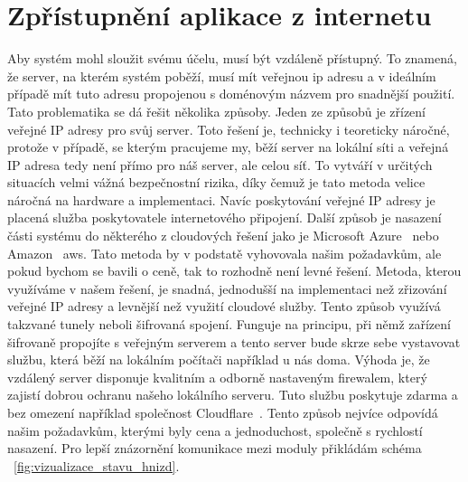 \section{Zpřístupnění aplikace z internetu}\label{sec:zpristupneni-aplikace-z-internetu}
Aby systém mohl sloužit svému účelu, musí být vzdáleně přístupný.
To znamená, že server, na kterém systém poběží, musí mít veřejnou \gls{ip} adresu a v ideálním případě mít tuto adresu propojenou s doménovým názvem pro snadnější použití.
Tato problematika se dá řešit několika způsoby.\newline
Jeden ze způsobů je zřízení veřejné IP adresy pro svůj server.
Toto řešení je, technicky i teoreticky náročné, protože v případě, se kterým pracujeme my, běží server na lokální síti a veřejná IP adresa tedy není přímo pro náš server, ale celou síť.
To vytváří v určitých situacích velmi vážná bezpečnostní rizika, díky čemuž je tato metoda velice náročná na hardware a implementaci.
Navíc poskytování veřejné IP adresy je placená služba poskytovatele internetového připojení.\newline
Další způsob je nasazení části systému do některého z cloudových řešení jako je Microsoft Azure~\cite{aml} nebo Amazon~\cite{AWS} \gls{aws}.
Tato metoda by v podstatě vyhovovala našim požadavkům, ale pokud bychom se bavili o ceně, tak to rozhodně není levné řešení. \newline
Metoda, kterou využíváme v našem řešení, je snadná, jednodušší na implementaci než zřizování veřejné IP adresy a levnější než využití cloudové služby.
Tento způsob využívá takzvané tunely neboli šifrovaná spojení.
Funguje na principu, při němž zařízení šifrovaně propojíte s veřejným serverem a tento server bude skrze sebe vystavovat službu, která běží na lokálním počítači například u nás doma.
Výhoda je, že vzdálený server disponuje kvalitním a odborně nastaveným firewalem, který zajistí dobrou ochranu našeho lokálního serveru.
Tuto službu poskytuje zdarma a bez omezení například společnost Cloudflare~\cite{cloudflare}.
Tento způsob nejvíce odpovídá našim požadavkům, kterými byly cena a jednoduchost, společně s rychlostí nasazení.
Pro lepší znázornění komunikace mezi moduly přikládám schéma ~\ref{fig:vizualizace_stavu_hnizd}.

